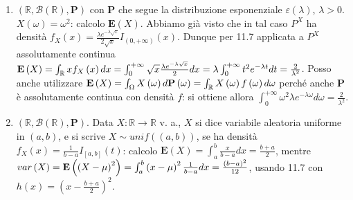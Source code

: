 \documentclass{article}
\begin{document}
\begin{enumerate}
\item $\left( 
\mathbb{R}
,\mathcal{B}\left( 
\mathbb{R}
\right) ,\mathbf{P}\right) $ con $\mathbf{P}$ che segue la distribuzione
esponenziale $\varepsilon \left( \lambda \right) $, $\lambda >0$. $X\left(
\omega \right) =\omega ^{2}$: calcolo $\mathbf{E}\left( X\right) $. Abbiamo
gi\`{a} visto che in tal caso $P^{X}$ ha densit\`{a} $f_{X}\left( x\right) =%
\frac{\lambda e^{-\lambda \sqrt{x}}}{2\sqrt{x}}I_{\left( 0,+\infty \right)
}\left( x\right) $. Dunque per 11.7 applicata a $P^{X}$ assolutamente
continua $\mathbf{E}\left( X\right) =\int_{%
\mathbb{R}
}xf_{X}\left( x\right) dx=\int_{0}^{+\infty }\sqrt{x}\frac{\lambda
e^{-\lambda \sqrt{x}}}{2}dx=\lambda \int_{0}^{+\infty }t^{2}e^{-\lambda t}dt=%
\frac{2}{\lambda ^{2}}$. Posso anche utilizzare $\mathbf{E}\left( X\right)
=\int_{\Omega }X\left( \omega \right) d\mathbf{P}\left( \omega \right)
=\int_{%
\mathbb{R}
}X\left( \omega \right) f\left( \omega \right) d\omega $ perch\'{e} anche $%
\mathbf{P}$ \`{e} assolutamente continua con densit\`{a} $f$: si ottiene
allora $\int_{0}^{+\infty }\omega ^{2}\lambda e^{-\lambda \omega }d\omega =%
\frac{2}{\lambda ^{2}}$.

\item $\left( 
\mathbb{R}
,\mathcal{B}\left( 
\mathbb{R}
\right) ,\mathbf{P}\right) $. Data $X:%
\mathbb{R}
\rightarrow 
\mathbb{R}
$ v. a., $X$ si dice variabile aleatoria uniforme in $\left( a,b\right) $, e
si scrive $X\sim unif\left( \left( a,b\right) \right) $, se ha densit\`{a} $%
f_{X}\left( x\right) =\frac{1}{b-a}I_{\left[ a,b\right] }\left( t\right) $:
calcolo $\mathbf{E}\left( X\right) =\int_{a}^{b}\frac{x}{b-a}dx=\frac{b+a}{2}
$, mentre $var\left( X\right) =\mathbf{E}\left( \left( X-\mu \right)
^{2}\right) =\int_{a}^{b}\left( x-\mu \right) ^{2}\frac{1}{b-a}dx=\frac{%
\left( b-a\right) ^{2}}{12}$, usando 11.7 con $h\left( x\right) =\left( x-%
\frac{b+a}{2}\right) ^{2}$.


\end{enumerate}
\end{document}
